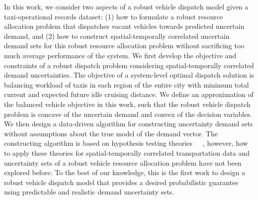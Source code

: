 \documentclass[10pt,twocolumn,twoside,english]{IEEEtran}
\begin{document}
In this work, we consider two aspects of a robust vehicle dispatch model given a taxi-operational records dataset: (1) how to formulate a robust resource allocation problem that dispatches vacant vehicles towards predicted uncertain demand, and (2) how to construct spatial-temporally correlated uncertain demand sets for this robust resource allocation problem without sacrificing too much average performance of the system. We first develop the objective and constraints of a robust dispatch problem considering spatial-temporally correlated demand uncertainties. The objective of a system-level optimal dispatch solution is balancing workload of taxis in each region of the entire city with minimum total current and expected future idle cruising distance. We define an approximation of the balanced vehicle objective in this work, such that the robust vehicle dispatch problem is concave of the uncertain demand and convex of the decision variables. We then design a data-driven algorithm for constructing uncertainty demand sets without assumptions about the true model of the demand vector. The constructing algorithm is based on hypothesis testing theories~\cite{datad_robust}~\cite{N_1970}~\cite{SC_2003}, however, how to apply these theories for spatial-temporally correlated transportation data and uncertainty sets of a robust vehicle resource allocation problem have not been explored before. To the best of our knowledge, this is the first work to design a robust vehicle dispatch model that provides a desired probabilistic guarantee using predictable and realistic demand uncertainty sets.
\end{document}
